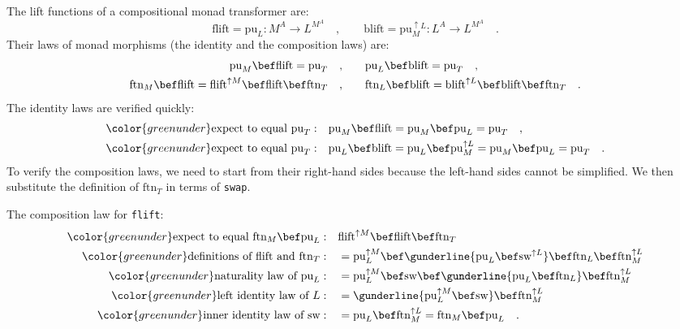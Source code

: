 The lift functions of a compositional monad transformer are:
\[
\text{flift}=\text{pu}_{L}:M^{A}\rightarrow L^{M^{A}}\quad,\quad\quad\text{blift}=\text{pu}_{M}^{\uparrow L}:L^{A}\rightarrow L^{M^{A}}\quad.
\]
Their laws of monad morphisms (the identity and the composition laws)
are:
\begin{align*}
\text{pu}_{M}\bef\text{flift}=\text{pu}_{T}\quad,\quad & \quad\text{pu}_{L}\bef\text{blift}=\text{pu}_{T}\quad,\\
\text{ftn}_{M}\bef\text{flift}=\text{flift}^{\uparrow M}\bef\text{flift}\bef\text{ftn}_{T}\quad,\quad & \quad\text{ftn}_{L}\bef\text{blift}=\text{blift}^{\uparrow L}\bef\text{blift}\bef\text{ftn}_{T}\quad.
\end{align*}
The identity laws are verified quickly:
\begin{align*}
{\color{greenunder}\text{expect to equal }\text{pu}_{T}:}\quad & \text{pu}_{M}\bef\text{flift}=\text{pu}_{M}\bef\text{pu}_{L}=\text{pu}_{T}\quad,\\
{\color{greenunder}\text{expect to equal }\text{pu}_{T}:}\quad & \text{pu}_{L}\bef\text{blift}=\text{pu}_{L}\bef\text{pu}_{M}^{\uparrow L}=\text{pu}_{M}\bef\text{pu}_{L}=\text{pu}_{T}\quad.
\end{align*}
To verify the composition laws, we need to start from their right-hand
sides because the left-hand sides cannot be simplified. We then substitute
the definition of $\text{ftn}_{T}$ in terms of \lstinline!swap!.

The composition law for \lstinline!flift!:
\begin{align*}
{\color{greenunder}\text{expect to equal }\text{ftn}_{M}\bef\text{pu}_{L}:}\quad & \text{flift}^{\uparrow M}\bef\text{flift}\bef\text{ftn}_{T}\\
{\color{greenunder}\text{definitions of }\text{flift}\text{ and }\text{ftn}_{T}:}\quad & =\text{pu}_{L}^{\uparrow M}\bef\gunderline{\text{pu}_{L}\bef\text{sw}^{\uparrow L}}\bef\text{ftn}_{L}\bef\text{ftn}_{M}^{\uparrow L}\\
{\color{greenunder}\text{naturality law of }\text{pu}_{L}:}\quad & =\text{pu}_{L}^{\uparrow M}\bef\text{sw}\bef\gunderline{\text{pu}_{L}\bef\text{ftn}_{L}}\bef\text{ftn}_{M}^{\uparrow L}\\
{\color{greenunder}\text{left identity law of }L:}\quad & =\gunderline{\text{pu}_{L}^{\uparrow M}\bef\text{sw}}\bef\text{ftn}_{M}^{\uparrow L}\\
{\color{greenunder}\text{inner identity law of }\text{sw}:}\quad & =\text{pu}_{L}\bef\text{ftn}_{M}^{\uparrow L}=\text{ftn}_{M}\bef\text{pu}_{L}\quad.
\end{align*}

